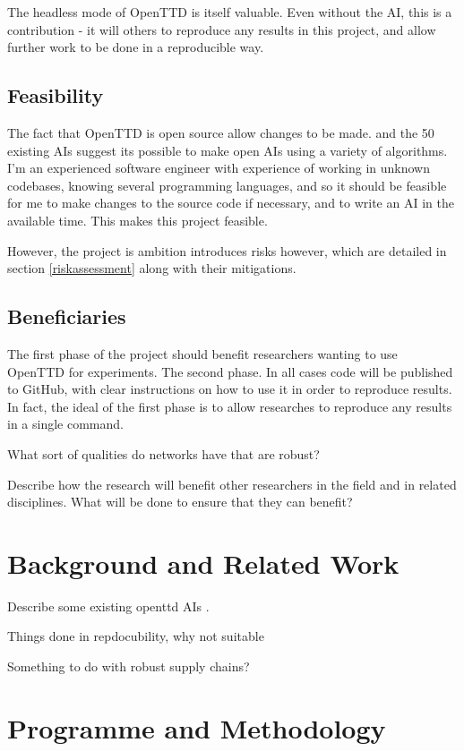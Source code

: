 \documentclass[a4paper,11pt]{article}
\begin{document}
The headless mode of OpenTTD is itself valuable. Even without the AI, this is a contribution - it will others to reproduce any results in this project, and allow further work to be done in a reproducible way.

\subsection{Feasibility}

The fact that OpenTTD is open source allow changes to be made. and the 50 existing AIs suggest its possible to make open AIs using a variety of algorithms. I'm an experienced software engineer with experience of working in unknown codebases, knowing several programming languages, and so it should be feasible for me to make changes to the source code if necessary, and to write an AI in the available time. This makes this project feasible.

However, the project is ambition introduces risks however, which are detailed in section \ref{riskassessment} along with their mitigations.

\subsection{Beneficiaries}

The first phase of the project should benefit researchers wanting to use OpenTTD for experiments. The second phase. In all cases code will be published to GitHub, with clear instructions on how to use it in order to reproduce results. In fact, the ideal of the first phase is to allow researches to reproduce any results in a single command.

What sort of qualities do networks have that are robust?

Describe how the research will benefit other researchers in the field and in related disciplines. What will be done to ensure that they can benefit? 

\section{Background and Related Work}

Describe some existing openttd AIs \cite{openttd}.

Things done in repdocubility, why not suitable

Something to do with robust supply chains?

\section{Programme and Methodology}
\end{document}
